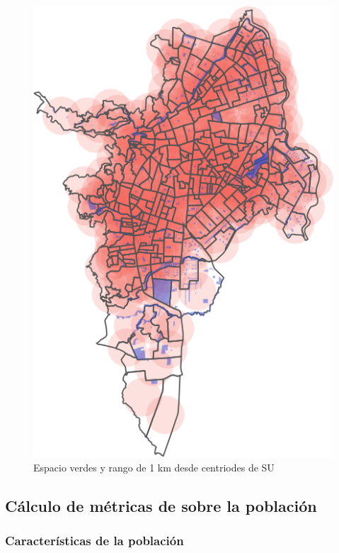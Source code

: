 \documentclass[12pt,]{book}
\begin{document}
\begin{figure}
\includegraphics[width=1\linewidth]{tesis-unigis_files/figure-latex/mapa-rango1km-1} \caption{Espacio verdes y rango de 1 km desde centriodes de SU}\label{fig:mapa-rango1km}
\end{figure}

\subsection{Cálculo de métricas de sobre la
población}\label{calculo-de-metricas-de-sobre-la-poblacion}

\subsubsection{Características de la
población}\label{caracteristicas-de-la-poblacion}
\end{document}
